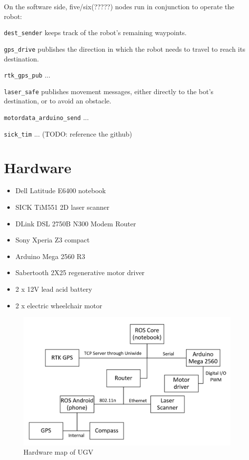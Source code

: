 \documentclass[titlepage,12pt,a4paper]{article}
\begin{document}
On the software side, five/six(?????) nodes run in conjunction to operate the robot:

\verb|dest_sender| keeps track of the robot's remaining waypoints.

\verb|gps_drive| publishes the direction in which the robot needs to travel to reach its destination.

\verb|rtk_gps_pub| ...

\verb|laser_safe| publishes movement messages, either directly to the bot's destination, or to avoid an obstacle.

\verb|motordata_arduino_send| ...

\verb|sick_tim| ... (TODO: reference the github)

\pagebreak
\section{Hardware}
\begin{itemize}
	\item Dell Latitude E6400 notebook
	\item SICK TiM551 2D laser scanner
	\item DLink DSL 2750B N300 Modem Router
	\item Sony Xperia Z3 compact
	\item Arduino Mega 2560 R3
	\item Sabertooth 2X25 regenerative motor driver
	\item 2 x 12V lead acid battery
	\item 2 x electric wheelchair motor
\end{itemize}

\begin{figure}
	\includegraphics[scale=0.8]{figures/hardware_chart.png}
	\caption{Hardware map of UGV}
	\label{figure:hardware_chart}
\end{figure}
\end{document}
